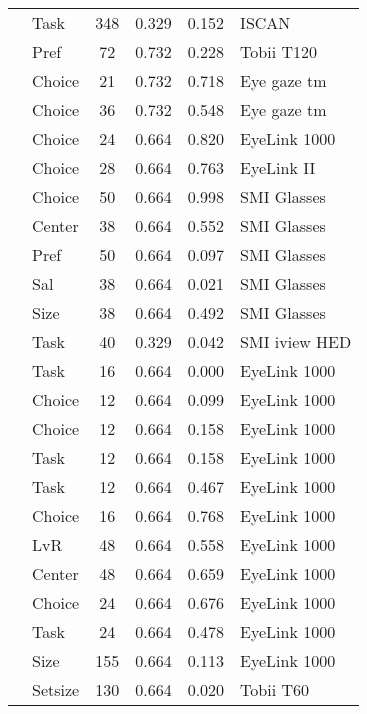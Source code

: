 \begin{longtable}{p{8cm}lcccl}
  \cite{chandon2009a} & Task & 348 & 0.329 & 0.152 & ISCAN \\ 
  \cite{du2014} & Pref & 72 & 0.732 & 0.228 & Tobii T120 \\ 
  \cite{fiedler2012} & Choice & 21 & 0.732 & 0.718 & Eye gaze tm \\ 
  \cite{fiedler2012} & Choice & 36 & 0.732 & 0.548 & Eye gaze tm \\ 
  \cite{folke2016} & Choice & 24 & 0.664 & 0.820 & EyeLink 1000 \\ 
  \cite{folke2016} & Choice & 28 & 0.664 & 0.763 & EyeLink II \\ 
  \cite{gidloef2017a} & Choice & 50 & 0.664 & 0.998 & SMI Glasses \\ 
  \cite{gidloef2017a} & Center & 38 & 0.664 & 0.552 & SMI Glasses \\ 
  \cite{gidloef2017a} & Pref & 50 & 0.664 & 0.097 & SMI Glasses \\ 
  \cite{gidloef2017a} & Sal & 38 & 0.664 & 0.021 & SMI Glasses \\ 
  \cite{gidloef2017a} & Size & 38 & 0.664 & 0.492 & SMI Glasses \\ 
  \cite{gidlof2013} & Task & 40 & 0.329 & 0.042 & SMI iview HED \\ 
  \cite{glaholt2009a} & Task & 16 & 0.664 & 0.000 & EyeLink 1000 \\ 
  \cite{glaholt2009b} & Choice & 12 & 0.664 & 0.099 & EyeLink 1000 \\ 
  \cite{glaholt2009b} & Choice & 12 & 0.664 & 0.158 & EyeLink 1000 \\ 
  \cite{glaholt2009b} & Task & 12 & 0.664 & 0.158 & EyeLink 1000 \\ 
  \cite{glaholt2009b} & Task & 12 & 0.664 & 0.467 & EyeLink 1000 \\ 
  \cite{glaholt2009c} & Choice & 16 & 0.664 & 0.768 & EyeLink 1000 \\ 
  \cite{glaholt2010} & LvR & 48 & 0.664 & 0.558 & EyeLink 1000 \\ 
  \cite{glaholt2010} & Center & 48 & 0.664 & 0.659 & EyeLink 1000 \\ 
  \cite{glaholt2012} & Choice & 24 & 0.664 & 0.676 & EyeLink 1000 \\ 
  \cite{glaholt2012} & Task & 24 & 0.664 & 0.478 & EyeLink 1000 \\ 
  \cite{graham2016} & Size & 155 & 0.664 & 0.113 & EyeLink 1000 \\ 
  \cite{grebitus2015} & Setsize & 130 & 0.664 & 0.020 & Tobii T60 \\ 

\end{longtable}
